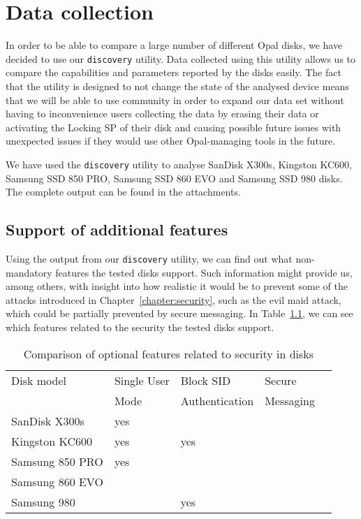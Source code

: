 \chapter{Data collection}
\label{chapter:data}

In order to be able to compare a large number of different Opal disks, we have decided to use our \verb|discovery| utility. 
Data collected using this utility allows us to compare the capabilities and parameters reported by the disks easily. 
The fact that the utility is designed to not change the state of the analysed device means that we will be able to use community in order to expand our data set without having to inconvenience users collecting the data by erasing their data or activating the Locking SP of their disk and causing possible future issues with unexpected issues if they would use other Opal-managing tools in the future.

We have used the \verb|discovery| utility to analyse SanDisk X300s, Kingston KC600, Samsung SSD 850 PRO, Samsung SSD 860 EVO and Samsung SSD 980 disks. The complete output can be found in the attachments.


\section{Support of additional features}

Using the output from our \verb|discovery| utility, we can find out what non-mandatory features the tested disks support.
Such information might provide us, among others, with insight into how realistic it would be to prevent some of the attacks introduced in Chapter~\ref{chapter:security}, such as the evil maid attack, which could be partially prevented by secure messaging.
In Table~\ref{table:compare_feature_sets}, we can see which features related to the security the tested disks support.

\begin{table}
\small
\begin{tabularx}{\textwidth}{lXXXX}
\toprule
Disk model      & Single User & Block SID        & Secure  \\ 
                & Mode        & Authentication   & Messaging \\ 
\midrule
SanDisk X300s   & yes              &                          &                   \\
Kingston KC600  & yes              & yes                      &                   \\
Samsung 850 PRO & yes              &                          &                   \\
Samsung 860 EVO &                  &                          &                   \\
Samsung 980     &                  & yes                      &                  \\ 
\bottomrule
\end{tabularx}
\caption{Comparison of optional features related to security in disks}
\label{table:compare_feature_sets}
\end{table}




